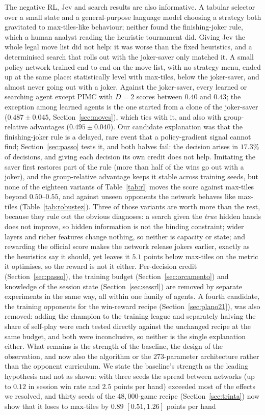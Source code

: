 \documentclass[11pt]{article}
\begin{document}
The negative RL, Jev and search results are also informative. A tabular selector over a small state and a general-purpose language model choosing a strategy both gravitated to max-tiles-like behaviour; neither found the finishing-joker rule, which a human analyst reading the heuristic tournament did. Giving Jev the whole legal move list did not help: it was worse than the fixed heuristics, and a determinised search that rolls out with the joker-saver only matched it. A small policy network trained end to end on the move list, with no strategy menu, ended up at the same place: statistically level with max-tiles, below the joker-saver, and almost never going out with a joker. Against the joker-saver, every learned or searching agent except PIMC with $D=2$ scores between $0.40$ and $0.43$; the exception among learned agents is the one started from a clone of the joker-saver ($0.487\pm0.045$, Section~\ref{sec:moves}), which ties with it, and also with group-relative advantages ($0.495\pm0.040$). Our candidate explanation was that the finishing-joker rule is a delayed, rare event that a policy-gradient signal cannot find; Section~\ref{sec:passo} tests it, and both halves fail: the decision arises in $17.3\%$ of decisions, and giving each decision its own credit does not help. Imitating the saver first restores part of the rule (more than half of the wins go out with a joker), and the group-relative advantage keeps it stable across training seeds, but none of the eighteen variants of Table~\ref{tab:rl} moves the score against max-tiles beyond $0.50$--$0.55$, and against unseen opponents the network behaves like max-tiles (Table~\ref{tab:robustez}). Three of those variants are worth more than the rest, because they rule out the obvious diagnoses: a search given the \emph{true} hidden hands does not improve, so hidden information is not the binding constraint; wider layers and richer features change nothing, so neither is capacity or state; and rewarding the official score makes the network release jokers earlier, exactly as the heuristics say it should, yet leaves it $5.1$ points below max-tiles on the metric it optimises, so the reward is not it either. Per-decision credit (Section~\ref{sec:passo}), the training budget (Section~\ref{sec:orcamento}) and knowledge of the session state (Section~\ref{sec:sessrl}) are removed by separate experiments in the same way, all within one family of agents. A fourth candidate, the training opponents for the win-reward recipe (Section~\ref{sec:plano21}), was also removed: adding the champion to the training league and separately halving the share of self-play were each tested directly against the unchanged recipe at the same budget, and both were inconclusive, so neither is the single explanation either. What remains is the strength of the baseline, the design of the observation, and now also the algorithm or the $273$-parameter architecture rather than the opponent curriculum. We state the baseline's strength as the leading hypothesis and not as shown: with three seeds the spread between networks (up to $0.12$ in session win rate and $2.5$ points per hand) exceeded most of the effects we resolved, and thirty seeds of the $48{,}000$-game recipe (Section~\ref{sec:trinta}) now show that it loses to max-tiles by $0.89$ $[0.51,1.26]$ points per hand 
\end{document}
